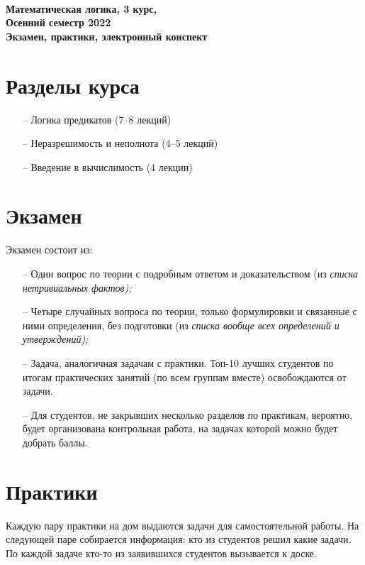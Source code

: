 \documentclass[a4paper,12pt]{article}
\begin{document}
\begin{center} {\LARGE\bf \ \\
	Математическая логика, 3 курс, \\
	Осенний семестр 2022 \\
	Экзамен, практики, электронный конспект \\}
\end{center}

\section{Разделы курса}
\begin{enumerate}
	\item[–] Логика предикатов (7–8 лекций)
	\item[–] Неразрешимость и неполнота (4–5 лекций)
	\item[–] Введение в вычислимость (4 лекции)
\end{enumerate}

\section{Экзамен}

Экзамен состоит из:

\begin{enumerate}
	\item[–] Один вопрос по теории с подробным ответом и доказательством (из {\it списка нетривиальных фактов);}
	\item[–] Четыре случайных вопроса по теории, только формулировки и связанные с ними определения, без подготовки (из {\it списка вообще всех определений и утверждений);}
	\item[–] Задача, аналогичная задачам с практики. Топ-10 лучших студентов по итогам практических занятий (по всем группам вместе) освобождаются от задачи.
	\item[–] Для студентов, не закрывших несколько разделов по практикам, вероятно, будет организована контрольная работа, на задачах которой можно будет добрать баллы.
\end{enumerate}

\section{Практики}

	Каждую пару практики на дом выдаются задачи для самостоятельной работы. На следующей паре собирается информация: кто из студентов решил какие задачи. По каждой задаче кто-то из заявившихся студентов вызывается к доске.
\end{document}
